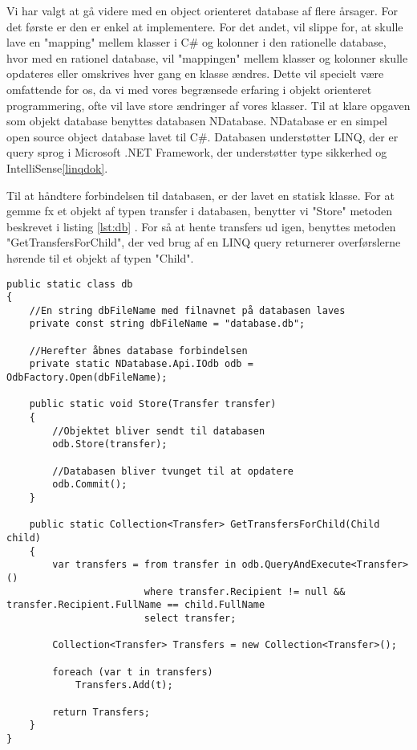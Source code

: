 Vi har valgt at gå videre med en object orienteret database af flere årsager. For det første er den er enkel at implementere. For det andet, vil slippe for, at skulle lave en "mapping" mellem klasser i C\# og kolonner i den rationelle database, hvor med en rationel database, vil "mappingen" mellem klasser og kolonner skulle opdateres eller omskrives hver gang en klasse ændres. Dette vil specielt være omfattende for os, da vi med vores begrænsede erfaring i objekt orienteret programmering, ofte vil lave store ændringer af vores klasser.
Til at klare opgaven som objekt database benyttes databasen NDatabase. NDatabase er en simpel open source object database lavet til C\#. Databasen understøtter LINQ, der er query sprog i Microsoft .NET Framework, der understøtter type sikkerhed og IntelliSense\ref{linqdok}.

Til at håndtere forbindelsen til databasen, er der lavet en statisk klasse. For at gemme fx et objekt af typen transfer i databasen, benytter vi "Store" metoden beskrevet i listing \ref{lst:db} . For så at hente transfers ud igen, benyttes metoden "GetTransfersForChild", der ved brug af en LINQ query returnerer overførslerne hørende til et objekt af typen "Child".
\\

\begin{lstlisting}[caption={Uddrag af filen "db.cs" fra kildekoden til programmet},label={lst:db}]
public static class db
{
	//En string dbFileName med filnavnet på databasen laves
	private const string dbFileName = "database.db";
	
	//Herefter åbnes database forbindelsen
	private static NDatabase.Api.IOdb odb = OdbFactory.Open(dbFileName);

	public static void Store(Transfer transfer)
	{
		//Objektet bliver sendt til databasen
		odb.Store(transfer);
		
		//Databasen bliver tvunget til at opdatere
		odb.Commit();
	}
	
	public static Collection<Transfer> GetTransfersForChild(Child child)
	{
		var transfers = from transfer in odb.QueryAndExecute<Transfer>()
						where transfer.Recipient != null && transfer.Recipient.FullName == child.FullName
						select transfer;

		Collection<Transfer> Transfers = new Collection<Transfer>();

		foreach (var t in transfers)
			Transfers.Add(t);

		return Transfers;
	}
}
\end{lstlisting}